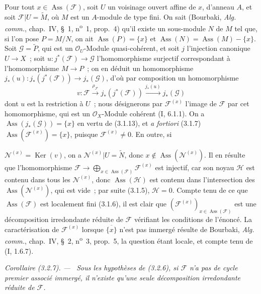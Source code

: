 \documentclass[10pt,oneside]{book}
\newcommand{\oldpage}[2][]{%
  \setcounter{footnote}{0}%
  \marginpar{\scriptsize\textbf{#1}~|~#2}\ignorespaces}
\newenvironment{corollary}[1][]{%
  \par\medskip\noindent\itshape Corollaire (#1). ---\ }{\par}
\begin{document}
Pour tout $x\in\operatorname{Ass}(\mathcal F)$, soit $U$ un voisinage ouvert
affine de $x$, d'anneau $A$, et soit $\mathcal F|U=\widetilde M$, où $M$ est
un $A$-module de type fini. On sait (Bourbaki, \emph{Alg. comm.}, chap.~IV,
\S~1, n\textsuperscript{o}~1, prop.~4) qu'il existe un sous-module $N$ de $M$
tel que, si l'on pose $P=M/N$, on ait
$\operatorname{Ass}(P)=\{x\}$ et
$\operatorname{Ass}(N)=\operatorname{Ass}(M)-\{x\}$. Soit
$\mathcal G=\widetilde P$, qui est un $\mathcal O_U$-Module quasi-cohérent, et
soit $j$ l'injection canonique $U\to X$~; soit
$u:j^*(\mathcal F)\to\mathcal G$ l'homomorphisme surjectif correspondant à
l'homomorphisme $M\to P$~; on en déduit un homomorphisme
$j_*(u):j_*(j^*(\mathcal F))\to j_*(\mathcal G)$, d'où par composition un
homomorphisme
\[
v:\mathcal F\xrightarrow{\rho_{\mathcal F}}j_*(j^*(\mathcal F))
\xrightarrow{j_*(u)}j_*(\mathcal G)
\]
dont $u$ est la restriction à $U$~; nous désignerons par
$\mathcal F^{(x)}$ l'image de $\mathcal F$ par cet homomorphisme, qui est un
$\mathcal O_X$-Module cohérent (I, 6.1.1). On a
$\operatorname{Ass}(j_*(\mathcal G))=\{x\}$ en vertu de (3.1.13), et
\emph{a fortiori} (3.1.7)
$\operatorname{Ass}(\mathcal F^{(x)})=\{x\}$, puisque
$\mathcal F^{(x)}\ne0$. En outre, si

\oldpage[IV-2]{43}
$\mathcal N^{(x)}=\operatorname{Ker}(v)$, on a
$\mathcal N^{(x)}|U=\widetilde N$, donc
$x\notin\operatorname{Ass}(\mathcal N^{(x)})$. Il en résulte que
l'homomorphisme
$\mathcal F\to\bigoplus_{x\in\operatorname{Ass}(\mathcal F)}
\mathcal F^{(x)}$ est injectif, car son noyau $\mathcal H$ est contenu dans
tous les $\mathcal N^{(x)}$, donc $\operatorname{Ass}(\mathcal H)$ est contenu
dans l'intersection des $\operatorname{Ass}(\mathcal N^{(x)})$, qui est vide~;
par suite (3.1.5), $\mathcal H=0$. Compte tenu de ce que
$\operatorname{Ass}(\mathcal F)$ est localement fini (3.1.6), il est clair que
$(\mathcal F^{(x)})_{x\in\operatorname{Ass}(\mathcal F)}$ est une
décomposition irredondante réduite de $\mathcal F$ vérifiant les conditions de
l'énoncé. La caractérisation de $\mathcal F^{(x)}$ lorsque
$\overline{\{x\}}$ n'est pas immergé résulte de Bourbaki,
\emph{Alg. comm.}, chap.~IV, \S~2, n\textsuperscript{o}~3, prop.~5, la question
étant locale, et compte tenu de (I, 1.6.7).

\begin{corollary}[3.2.7]
\label{IV.2.3.2.7-fr}
Sous les hypothèses de (3.2.6), si $\mathcal F$ n'a pas de cycle premier
associé immergé, il n'existe qu'une seule décomposition irredondante réduite de
$\mathcal F$.
\end{corollary}
\end{document}
